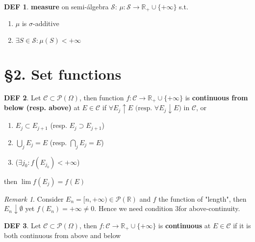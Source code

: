\documentclass[hidelinks]{article}
\theoremstyle{definition}
\newtheorem*{defin}{DEF}
\theoremstyle{dotless}
\theoremstyle{remark}
\newtheorem*{remark}{Remark}
\begin{document}
\begin{defin}
\textbf{measure} on semi-álgebra $\mathscr{S}$: $\mu:\mathscr{S}\to\mathbb{R}_+\cup\{+\infty\}$ s.t. \begin{enumerate}[label=\arabic*\degree]
    \item $\mu$ is $\sigma$-additive 
    \item $\exists S\in\mathscr{S}:\mu(S)<+\infty$
\end{enumerate}
\end{defin}

\bigbreak

\section*{\S2. Set functions}
\setcounter{section}{2}

\begin{defin}
Let $\mathscr{C}\subset\mathscr{P}(\Omega)$, then function $f:\mathscr{C}\to\mathbb{R}_+\cup\{+\infty\}$ is \textbf{continuous from below (resp. above)} at $E\in\mathscr{C}$ if $\forall E_j\uparrow E\textrm{ (resp. }\forall E_j\downarrow E)$ in $\mathscr{C}$, or
\begin{enumerate}[label=\arabic*\degree]
    \item $E_j\subset E_{j+1}$ (resp. $E_j\supset E_{j+1}$)
    \item $\bigcup\limits_jE_j=E$ (resp. $\bigcap\limits_jE_j=E$)
    \item ($\exists j_0:f(E_{j_0})<+\infty$)
\end{enumerate}
then $\lim f(E_j)=f(E)$
\end{defin}

\begin{remark}
Consider $E_n=[n,+\infty)\in\mathscr{P}(\mathbb{R})$ and $f$ the function of "length", then $E_n\downarrow\emptyset$ yet $f(E_n)=+\infty\neq0$. Hence we need condition 3\degree for above-continuity.
\end{remark}

\begin{defin}
Let $\mathscr{C}\subset\mathscr{P}(\Omega)$, then $f:\mathscr{C}\to\mathbb{R}_+\cup\{+\infty\}$ is \textbf{continuous} at $E\in\mathscr{C}$ if it is both continuous from above and below
\end{defin}
\end{document}
